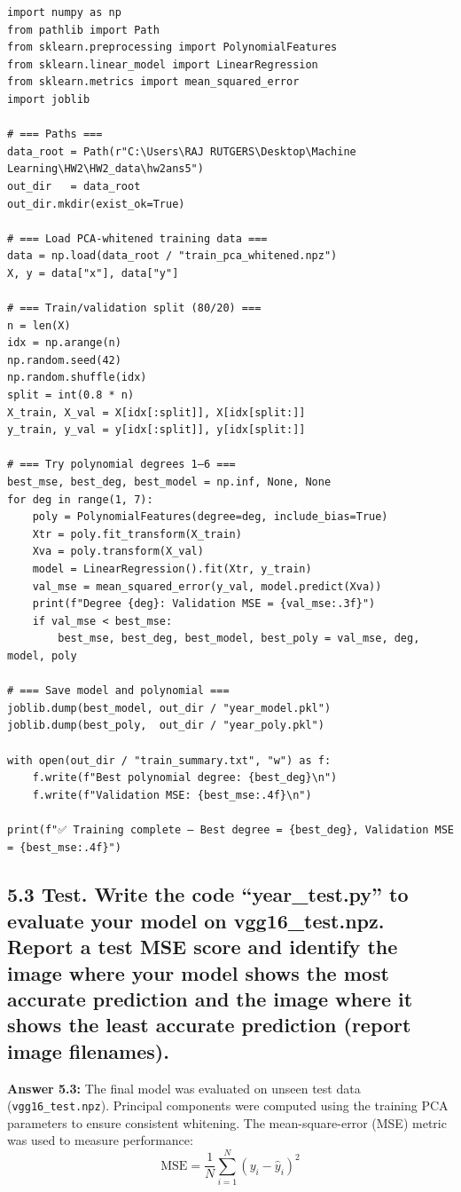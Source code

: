 \documentclass[12pt]{article}
\begin{document}
\begin{lstlisting}[style=pythonstyle, caption={year\_train.py – Polynomial Regression Training}]
import numpy as np
from pathlib import Path
from sklearn.preprocessing import PolynomialFeatures
from sklearn.linear_model import LinearRegression
from sklearn.metrics import mean_squared_error
import joblib

# === Paths ===
data_root = Path(r"C:\Users\RAJ RUTGERS\Desktop\Machine Learning\HW2\HW2_data\hw2ans5")
out_dir   = data_root
out_dir.mkdir(exist_ok=True)

# === Load PCA-whitened training data ===
data = np.load(data_root / "train_pca_whitened.npz")
X, y = data["x"], data["y"]

# === Train/validation split (80/20) ===
n = len(X)
idx = np.arange(n)
np.random.seed(42)
np.random.shuffle(idx)
split = int(0.8 * n)
X_train, X_val = X[idx[:split]], X[idx[split:]]
y_train, y_val = y[idx[:split]], y[idx[split:]]

# === Try polynomial degrees 1–6 ===
best_mse, best_deg, best_model = np.inf, None, None
for deg in range(1, 7):
    poly = PolynomialFeatures(degree=deg, include_bias=True)
    Xtr = poly.fit_transform(X_train)
    Xva = poly.transform(X_val)
    model = LinearRegression().fit(Xtr, y_train)
    val_mse = mean_squared_error(y_val, model.predict(Xva))
    print(f"Degree {deg}: Validation MSE = {val_mse:.3f}")
    if val_mse < best_mse:
        best_mse, best_deg, best_model, best_poly = val_mse, deg, model, poly

# === Save model and polynomial ===
joblib.dump(best_model, out_dir / "year_model.pkl")
joblib.dump(best_poly,  out_dir / "year_poly.pkl")

with open(out_dir / "train_summary.txt", "w") as f:
    f.write(f"Best polynomial degree: {best_deg}\n")
    f.write(f"Validation MSE: {best_mse:.4f}\n")

print(f"✅ Training complete — Best degree = {best_deg}, Validation MSE = {best_mse:.4f}")
\end{lstlisting}


\subsection*{5.3
Test. Write the code “year\_test.py” to evaluate your model on vgg16\_test.npz. Report a test MSE score and identify the image where your model shows the most accurate prediction and the image where it shows the least accurate prediction (report image filenames).}
\textbf{Answer 5.3:}
The final model was evaluated on unseen test data (\texttt{vgg16\_test.npz}).
Principal components were computed using the training PCA parameters to ensure
consistent whitening. The mean-square-error (MSE) metric was used to measure performance:
\[
\mathrm{MSE} = \frac{1}{N}\sum_{i=1}^{N} (y_i - \hat{y}_i)^2
\]
\end{document}
